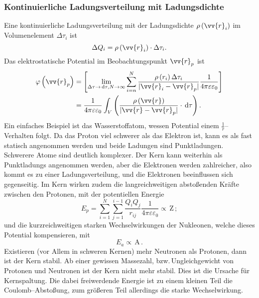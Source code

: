 \subsubsection{Kontinuierliche Ladungsverteilung mit Ladungsdichte}
Eine kontinuierliche Ladungsverteilung mit der Ladungsdichte $\rho \left(\vv{r}_i\right)$ im Volumenelement $\Delta \tau _i$ ist
\[ 
        \Delta Q_i=\rho \left(\vv{r}_i\right)\cdot \Delta \tau _i
.\] 
Das elektrostatische Potential im Beobachtungspunkt $\vv{r}_p$ ist
\begin{align*}
        \varphi \left(\vv{r}_p\right)&=\left[\lim_{\Delta \tau \rightarrow \td \tau ,N\rightarrow \infty}\sum_{i=n}^{N}\dfrac{\rho \left(r_i\right)\Delta \tau _i}{|\vv{r}_i-\vv{r}_p|}\dfrac{1}{4\pi \varepsilon \varepsilon _0}\right]\\
                                     &=\dfrac{1}{4\pi \varepsilon \varepsilon _0}\int_{V}^{}\left(\dfrac{\rho \left(\vv{r}\right)}{|\vv{r}-\vv{r}_p|}\cdot \td \tau \right)
.\end{align*}
Ein einfaches Beispiel ist das Wasserstoffatom, wessen Potential einem $\tfrac{1}{r}$--Verhalten folgt. Da das Proton viel schwerer als das Elektron ist, kann es als fast statisch angenommen werden und beide Ladungen sind Punktladungen. Schwerere Atome sind deutlich komplexer. Der Kern kann weiterhin als Punktladungs angenommen werden, aber die Elektronen werden zahlreicher, also kommt es zu einer Ladungsverteilung, und die Elektronen beeinflussen sich gegenseitig. Im Kern wirken zudem die langreichweitigen abstoßenden Kräfte zwischen den Protonen, mit der potentiellen Energie
\[ 
        E_p=\sum_{i=1}^{N}\sum_{j=1}^{i-1}\dfrac{Q_iQ_j}{r_{ij}}\dfrac{1}{4\pi \varepsilon \varepsilon _0}\propto \,\text{Z}\,
;\] und die kurzreichweitigen starken Wechselwirkungen der Nukleonen, welche dieses Potential kompensieren, mit
\[ 
        E_a\propto \,\text{A}\,
.\] 
Existieren (vor Allem in schweren Kernen) mehr Neutronen als Protonen, dann ist der Kern stabil. Ab einer gewissen Massezahl, bzw.\,Ungleichgewicht von Protonen und Neutronen ist der Kern nicht mehr stabil. Dies ist die Ursache für Kernspaltung. Die dabei freiwerdende Energie ist zu einem kleinen Teil die Coulomb--Abstoßung, zum größeren Teil allerdings die starke Wechselwirkung.

